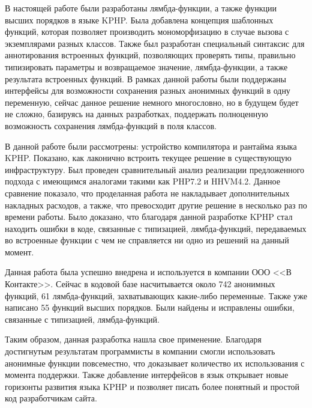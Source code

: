 
\startconclusionpage
В настоящей работе были разработаны лямбда-функции, а также функции высших порядков в языке KPHP.
Была добавлена концепция шаблонных функций, которая позволяет производить мономорфизацию в случае вызова с экземплярами разных классов.
Также был разработан специальный синтаксис для аннотирования встроенных функций, позволяющих проверять типы, правильно типизировать параметры и возвращаемое значение, лямбда-функции, а также результата встроенных функций.
В рамках данной работы были поддержаны интерфейсы для возможности сохранения разных анонимных функций в одну переменную, сейчас данное решение немного многословно, но в будущем будет не сложно, базируясь на данных разработках, поддержать полноценную возможность сохранения лямбда-функций в поля классов.

В данной работе были рассмотрены: устройство компилятора и рантайма языка KPHP.
Показано, как лаконично встроить текущее решение в существующую инфраструктуру.
Был проведен сравнительный анализ реализации предложенного подхода с имеющимся аналогами такими как PHP7.2 и HHVM4.2.
Данное сравнение показало, что проделанная работа не накладывает дополнительных накладных расходов, а также, что превосходит другие решение в несколько раз по времени работы.
Было доказано, что благодаря данной разработке KPHP стал находить ошибки в коде, связанные с типизацией, лямбда-функций, передаваемых во встроенные функции с чем не справляется ни одно из решений на данный момент.

Данная работа была успешно внедрена и используется в компании ООО <<В Контакте>>.
Сейчас в кодовой базе насчитывается около 742 анонимных функций, 61 лямбда-функций, захватывающих какие-либо переменные.
Также уже написано 55 функций высших порядков.
Были найдены и исправлены ошибки, связанные с типизацией, лямбда-функций.

Таким образом, данная разработка нашла свое применение.
Благодаря достигнутым результатам программисты в компании смогли использовать анонимные функции повсеместно, что доказывает количество их использования с момента поддержки.
Также добавление интерфейсов в язык открывает новые горизонты развития языка KPHP и позволяет писать более понятный и простой код разработчикам сайта.

\printmainbibliography
